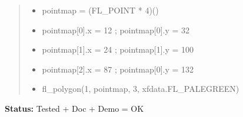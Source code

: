 \begin{boxedminipage}{\funcwidth}
\begin{quote}
\begin{itemize}
  \item
    \setlength{\parskip}{0.6ex}
pointmap = (FL\_POINT * 4)()



  \item pointmap[0].x = 12 ; pointmap[0].y = 32



  \item pointmap[1].x = 24 ; pointmap[1].y = 100



  \item pointmap[2].x = 87 ; pointmap[0].y = 132



  \item fl\_polygon(1, pointmap, 3, xfdata.FL\_PALEGREEN)



\end{itemize}

\end{quote}

\textbf{Status:} Tested + Doc + Demo = OK



    \end{boxedminipage}

    \label{xformslib:flxbasic:fl_polyf}

    \vspace{0.5ex}

